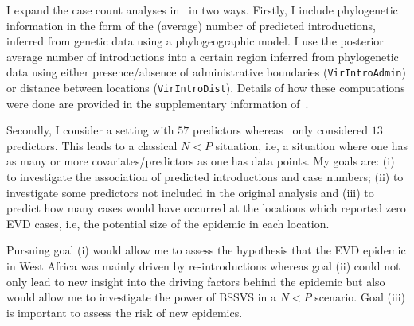 I expand the case count analyses in~\cite{Dudas2017} in two ways.
Firstly, I include phylogenetic information in the form of the (average) number of predicted introductions, inferred from genetic data using a phylogeographic model.
I use the posterior average number of introductions into a certain region inferred from phylogenetic data using either presence/absence of administrative boundaries (\verb|VirIntroAdmin|) or distance  between locations (\verb|VirIntroDist|).
Details of how these computations were done are provided in the supplementary information of~\cite{Dudas2017}.


Secondly, I consider a setting with $57$ predictors whereas~\cite{Dudas2017} only considered $13$ predictors.
This leads to a classical $N < P$ situation, i.e,  a situation where one has as many  or more covariates/predictors as one has data points.
My goals are: (i) to investigate the association of predicted introductions and case numbers; (ii) to investigate some predictors not included in the original analysis and (iii) to predict how many cases would have occurred at the locations which reported zero EVD cases, i.e, the potential size of the epidemic in each location.

Pursuing goal (i) would allow me to assess the hypothesis that the EVD epidemic in West Africa was mainly driven by re-introductions whereas goal (ii) could not only lead to new insight into the driving factors behind the epidemic but also would allow me to investigate the power of BSSVS in a $N<P$ scenario.
Goal (iii) is important to assess the risk of new epidemics.

